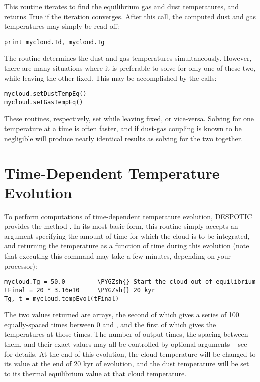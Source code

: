 \documentclass[letterpaper,10pt,english]{sphinxmanual}
\def\PYGZsh{\char`\#}
\begin{document}
This routine iterates to find the equilibrium gas and dust
temperatures, and returns True if the iteration converges. After this
call, the computed dust and gas temperatures may simply be read off:

\begin{Verbatim}[commandchars=\\\{\}]
print mycloud.Td, mycloud.Tg
\end{Verbatim}

The  routine determines the dust and gas
temperatures simultaneously. However, there are many situations where
it is preferable to solve for only one of these two, while leaving the
other fixed. This may be accomplished by the calls:

\begin{Verbatim}[commandchars=\\\{\}]
mycloud.setDustTempEq()
mycloud.setGasTempEq()
\end{Verbatim}

These routines, respectively, set  while leaving
 fixed, or vice-versa. Solving for one temperature at a
time is often faster, and if dust-gas coupling is known to be
negligible will produce nearly identical results as solving for the
two together.


\section{Time-Dependent Temperature Evolution}
\label{functions:ssec-temp-evol}\label{functions:time-dependent-temperature-evolution}
To perform computations of time-dependent temperature evolution,
DESPOTIC provides the method . In its most basic
form, this routine simply accepts an argument specifying the amount of
time for which the cloud is to be integrated, and returning the
temperature as a function of time during this evolution (note that
executing this command may take a few minutes, depending on your
processor):

\begin{Verbatim}[commandchars=\\\{\}]
mycloud.Tg = 50.0         \PYGZsh{} Start the cloud out of equilibrium
tFinal = 20 * 3.16e10     \PYGZsh{} 20 kyr
Tg, t = mycloud.tempEvol(tFinal)
\end{Verbatim}

The two values returned are arrays, the second of which gives a series
of 100 equally-spaced times between 0 and , and the first of
which gives the temperatures at those times. The number of output
times, the spacing between them, and their exact values may all be
controlled by optional arguments -- see {\hyperref[fulldoc:sssec\string-full\string-cloud]{}} for
details. At
the end of this evolution, the cloud temperature 
will be changed to its value at the end of 20 kyr of evolution, and
the dust temperature  will be set to its thermal
equilibrium value at that cloud temperature.
\end{document}
